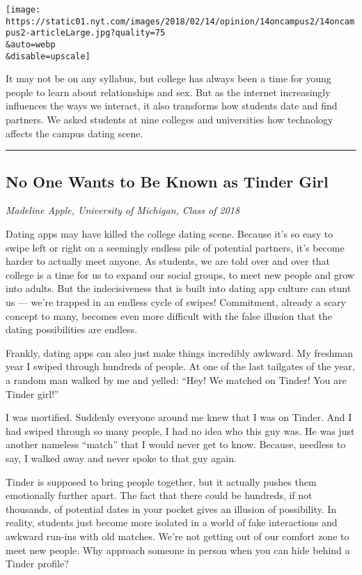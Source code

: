 \texttt{[image: https://static01.nyt.com/images/2018/02/14/opinion/14oncampus2/14oncampus2-articleLarge.jpg?quality=75\\\&auto=webp\\\&disable=upscale]}

It may not be on any syllabus, but college has always been a time for
young people to learn about relationships and sex. But as the internet
increasingly influences the ways we interact, it also transforms how
students date and find partners. We asked students at nine colleges and
universities how technology affects the campus dating scene.

\begin{center}\rule{0.5\linewidth}{\linethickness}\end{center}

\hypertarget{no-one-wants-to-be-known-as-tinder-girl}{%
\subsection{No One Wants to Be Known as Tinder
Girl}\label{no-one-wants-to-be-known-as-tinder-girl}}

\emph{Madeline Apple, University of Michigan, Class of 2018}

Dating apps may have killed the college dating scene. Because it's so
easy to swipe left or right on a seemingly endless pile of potential
partners, it's become harder to actually meet anyone. As students, we
are told over and over that college is a time for us to expand our
social groups, to meet new people and grow into adults. But the
indecisiveness that is built into dating app culture can stunt us ---
we're trapped in an endless cycle of swipes! Commitment, already a scary
concept to many, becomes even more difficult with the false illusion
that the dating possibilities are endless.

Frankly, dating apps can also just make things incredibly awkward. My
freshman year I swiped through hundreds of people. At one of the last
tailgates of the year, a random man walked by me and yelled: ``Hey! We
matched on Tinder! You are Tinder girl!''

I was mortified. Suddenly everyone around me knew that I was on Tinder.
And I had swiped through so many people, I had no idea who this guy was.
He was just another nameless ``match'' that I would never get to know.
Because, needless to say, I walked away and never spoke to that guy
again.

Tinder is supposed to bring people together, but it actually pushes them
emotionally further apart. The fact that there could be hundreds, if not
thousands, of potential dates in your pocket gives an illusion of
possibility. In reality, students just become more isolated in a world
of fake interactions and awkward run-ins with old matches. We're not
getting out of our comfort zone to meet new people. Why approach someone
in person when you can hide behind a Tinder profile?

